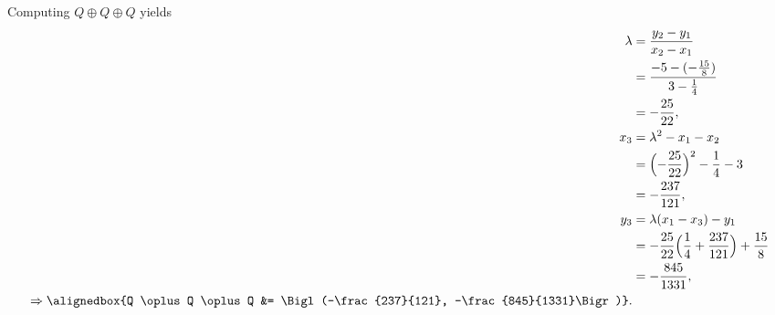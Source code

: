 \documentclass[
  coursecode={MTHE 418},
  assignmentname={Homework \homeworknumber},
  studentnumber=20053722,
  name={Bryan Hoang},
  draft,
]{
  ltxanswer%
}
\begin{document}
\begin{questions}
\begin{parts}
\begin{solution}
        Computing \(Q \oplus Q \oplus Q\) yields
        \begin{align*}
          \lambda                                     &= \frac{y_{2} - y_{1}}{x_{2} - x_{1}}                                     \\
                                                      &= \frac{-5 - (-\frac{15}{8})}{3 - \frac{1}{4}}                            \\
                                                      &= -\frac{25}{22},                                                         \\
          x_{3}                                       &= \lambda^{2} - x_{1} - x_{2}                                             \\
                                                      &= \Bigl(-\frac{25}{22}\Bigr)^{2} - \frac{1}{4} - 3                        \\
                                                      &= -\frac{237}{121},                                                       \\
          y_{3}                                       &= \lambda(x_{1} - x_{3}) - y_{1}                                          \\
                                                      &= -\frac{25}{22} \Bigl(\frac{1}{4} + \frac{237}{121}\Bigr) + \frac{15}{8} \\
                                                      &= -\frac{845}{1331},                                                      \\
          \Rightarrow \alignedbox{Q \oplus Q \oplus Q &= \Bigl(-\frac{237}{121}, -\frac{845}{1331}\Bigr)}.
        \end{align*}
      \end{solution}
    \end{parts}
  \end{questions}
\end{document}
